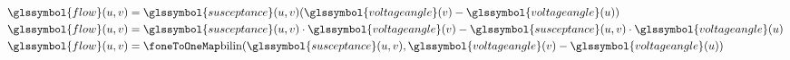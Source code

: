 \begin{align}
    \glssymbol{flow}(\vertexa,\vertexb) 
    &= 
    \glssymbol{susceptance}(\vertexa,\vertexb) 
    (\glssymbol{voltageangle}(\vertexb) 
    - \glssymbol{voltageangle}(\vertexa))
    \label{ch:facts:eq:bilinear:1}
\\
    \glssymbol{flow}(\vertexa,\vertexb) 
    &= 
    \glssymbol{susceptance}(\vertexa,\vertexb)\cdot\glssymbol{voltageangle}(\vertexb)
    -
    \glssymbol{susceptance}(\vertexa,\vertexb)\cdot\glssymbol{voltageangle}
    (\vertexa)
    \label{ch:facts:eq:bilinear:2}
\\
    \glssymbol{flow}(\vertexa,\vertexb) 
    &=
    \bilinearmap(\glssymbol{susceptance}(\vertexa,\vertexb),
    \glssymbol{voltageangle}(\vertexb)
    - \glssymbol{voltageangle}(\vertexa))
    \label{ch:facts:eq:bilinear:4}
\end{align}